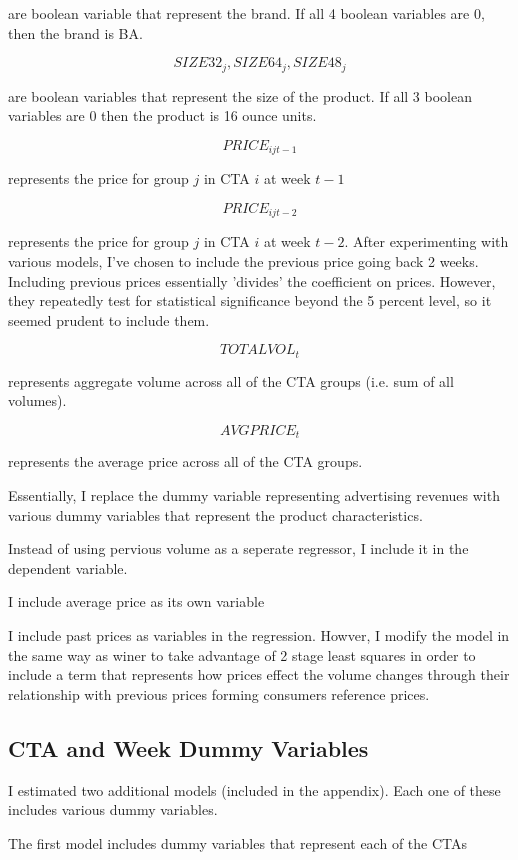 \documentclass{article}
\begin{document}
 are boolean variable that represent the brand. If all 4 boolean variables are 0, then the brand is BA. 

$$SIZE32_{j}, SIZE64_{j}, SIZE48_{j}$$ 

are boolean variables that represent the size of the product. If all 3 boolean variables are 0 then the product is 16 ounce units.

$${PRICE}_{ijt-1} $$

 represents the price for group $j$ in CTA $i$ at week $t-1$

$${PRICE}_{ijt-2} $$ 

represents the price for group $j$ in CTA $i$ at week $t-2$. After experimenting with various models, I've chosen to include the previous price going back 2 weeks. Including previous prices essentially 'divides' the coefficient on prices. However, they repeatedly test for statistical significance beyond the 5 percent level, so it seemed prudent to include them.

$${TOTALVOL}_t $$ 

represents aggregate volume across all of the CTA groups (i.e. sum of all volumes).

$${AVGPRICE}_{t} $$ 

represents the average price across all of the CTA groups.

Essentially, I replace the dummy variable representing advertising revenues with various dummy variables that represent the product characteristics.

Instead of using pervious volume as a seperate regressor, I include it in the dependent variable.

I include average price as its own variable

I include past prices as variables in the regression. Howver, I modify the model in the same way as winer to take advantage of 2 stage least squares in order to include a term that represents how prices effect the volume changes through their relationship with previous prices forming consumers reference prices.


\subsection{CTA and Week Dummy Variables}

I estimated two additional models (included in the appendix). Each one of these includes various dummy variables.

The first model includes dummy variables that represent each of the CTAs
\end{document}
